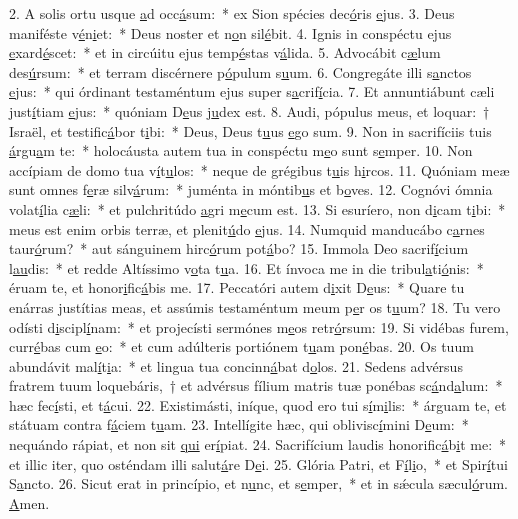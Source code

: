 2. A solis ortu usque \uline{a}d occ\uline{á}sum:~* ex Sion spécies dec\uline{ó}ris \uline{e}jus.
3. Deus maniféste v\uline{é}n\uline{i}et:~* Deus noster et n\uline{o}n sil\uline{é}bit.
4. Ignis in conspéctu ejus \uline{e}xard\uline{é}scet:~* et in circúitu ejus temp\uline{é}stas v\uline{á}lida.
5. Advocábit c\uline{æ}lum des\uline{ú}rsum:~* et terram discérnere p\uline{ó}pulum s\uline{u}um.
6. Congregáte illi s\uline{a}nctos \uline{e}jus:~* qui órdinant testaméntum ejus super s\uline{a}crif\uline{í}cia.
7. Et annuntiábunt cæli just\uline{í}tiam \uline{e}jus:~* quóniam D\uline{e}us j\uline{u}dex est.
8. Audi, pópulus meus, et loquar:~† Israël, et testific\uline{á}bor t\uline{i}bi:~* Deus, Deus t\uline{u}us \uline{e}go sum.
9. Non in sacrifíciis tuis \uline{á}rgu\uline{a}m te:~* holocáusta autem tua in conspéctu m\uline{e}o sunt s\uline{e}mper.
10. Non accípiam de domo tua v\uline{í}t\uline{u}los:~* neque de grégibus t\uline{u}is h\uline{i}rcos.
11. Quóniam meæ sunt omnes f\uline{e}ræ silv\uline{á}rum:~* juménta in móntib\uline{u}s et b\uline{o}ves.
12. Cognóvi ómnia volat\uline{í}lia c\uline{æ}li:~* et pulchritúdo \uline{a}gri m\uline{e}cum est.
13. Si esuríero, non d\uline{i}cam t\uline{i}bi:~* meus est enim orbis terræ, et plenit\uline{ú}do \uline{e}jus.
14. Numquid manducábo c\uline{a}rnes taur\uline{ó}rum?~* aut sánguinem hirc\uline{ó}rum pot\uline{á}bo?
15. Immola Deo sacrif\uline{í}cium l\uline{au}dis:~* et redde Altíssimo v\uline{o}ta t\uline{u}a.
16. Et ínvoca me in die tribul\uline{a}ti\uline{ó}nis:~* éruam te, et honor\uline{i}fic\uline{á}bis me.
17. Peccatóri autem d\uline{i}xit D\uline{e}us:~* Quare tu enárras justítias meas, et assúmis testaméntum meum p\uline{e}r os t\uline{u}um?
18. Tu vero odísti d\uline{i}scipl\uline{í}nam:~* et projecísti sermónes m\uline{e}os retr\uline{ó}rsum:
19. Si vidébas furem, curr\uline{é}bas cum \uline{e}o:~* et cum adúlteris portiónem t\uline{u}am pon\uline{é}bas.
20. Os tuum abundávit mal\uline{í}t\uline{i}a:~* et lingua tua concinn\uline{á}bat d\uline{o}los.
21. Sedens advérsus fratrem tuum loquebáris,~† et advérsus fílium matris tuæ ponébas sc\uline{á}nd\uline{a}lum:~* hæc fec\uline{í}sti, et t\uline{á}cui.
22. Existimásti, iníque, quod ero tui s\uline{í}m\uline{i}lis:~* árguam te, et státuam contra f\uline{á}ciem t\uline{u}am.
23. Intellígite hæc, qui oblivisc\uline{í}mini D\uline{e}um:~* nequándo rápiat, et non sit \uline{qui} er\uline{í}piat.
24. Sacrifícium laudis honorific\uline{á}b\uline{i}t me:~* et illic iter, quo osténdam illi salut\uline{á}re D\uline{e}i.
25. Glória Patri, et F\uline{í}l\uline{i}o,~* et Spir\uline{í}tui S\uline{a}ncto.
26. Sicut erat in princípio, et n\uline{u}nc, et s\uline{e}mper,~* et in sǽcula sæcul\uline{ó}rum. \uline{A}men.
